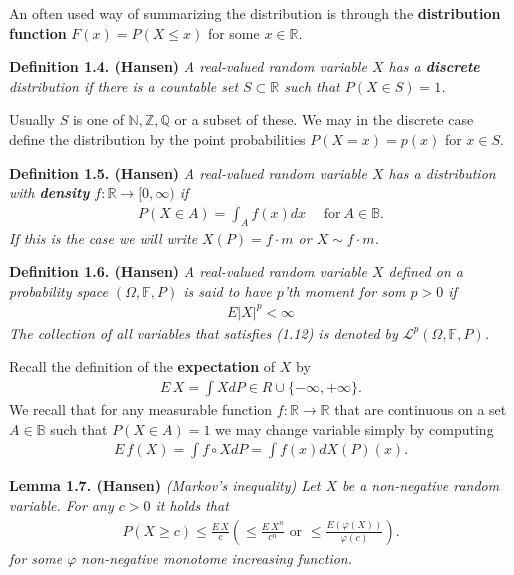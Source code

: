 \documentclass[
]{book}
\begin{document}
An often used way of summarizing the distribution is through the \textbf{distribution function} \(F(x)=P(X\le x)\) for some \(x\in\mathbb{R}\).

\textbf{Definition 1.4. (Hansen)} \emph{A real-valued random variable \(X\) has a \textbf{discrete} distribution if there is a countable set \(S\subset\mathbb{R}\) such that \(P(X\in S)=1\).}

Usually \(S\) is one of \(\mathbb{N},\mathbb{Z},\mathbb{Q}\) or a subset of these. We may in the discrete case define the distribution by the point probabilities \(P(X=x)=p(x)\) for \(x\in S\).

\textbf{Definition 1.5. (Hansen)} \emph{A real-valued random variable \(X\) has a distribution with \textbf{density} \(f : \mathbb{R}\to [0,\infty)\) if}
\begin{align*}
    P(X\in A)=\int_Af(x)dx\hspace{15pt}\text{for}\ A\in \mathbb{B}.\tag{1.5}
\end{align*}
\emph{If this is the case we will write \(X(P)=f\cdot m\) or \(X\sim f\cdot m\).}

\textbf{Definition 1.6. (Hansen)} \emph{A real-valued random variable \(X\) defined on a probability space \((\Omega, \mathbb{F},P)\) is said to have \(p\)'th moment for som \(p>0\) if}
\begin{align*}
    E\vert X\vert^p<\infty\tag{1.12}
\end{align*}
\emph{The collection of all variables that satisfies (1.12) is denoted by \(\mathcal{L}^p(\Omega,\mathbb{F},P)\).}

Recall the definition of the \textbf{expectation} of \(X\) by
\begin{align*}
    E\, X=\int XdP \in R\cup \{-\infty,+\infty\}.\tag{1.11}
\end{align*}
We recall that for any measurable function \(f : \mathbb{R}\to \mathbb{R}\) that are continuous on a set \(A\in\mathbb{B}\) such that \(P(X\in A)=1\) we may change variable simply by computing
\begin{align*}
    E\, f(X)=\int f\circ XdP=\int f(x)dX(P)(x).
\end{align*}

\textbf{Lemma 1.7. (Hansen)} \emph{(Markov's inequality) Let \(X\) be a non-negative random variable. For any \(c>0\) it holds that}
\begin{align*}
    P(X\ge c)\le \frac{E\, X}{c}\left(\le \frac{E\ X^n}{c^n}\text{ or }\le \frac{E\left(\varphi(X)\right)}{\varphi(c)}\right).\tag{1.14}
\end{align*}
\emph{for some \(\varphi\) non-negative monotome increasing function.}
\end{document}
